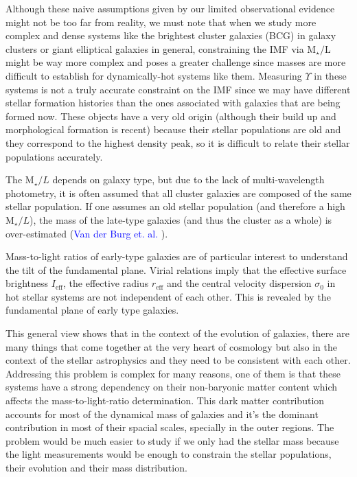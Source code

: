 Although these naive assumptions given by our limited observational evidence might not be too far from reality, we must note that when we study more complex and dense systems like the brightest cluster galaxies (BCG) in galaxy clusters or giant elliptical galaxies in general, constraining the IMF via $\textrm{M}_{\star}/\textrm{L}$ might be way more complex and poses a greater challenge since masses are more difficult to establish for dynamically-hot systems like them. Measuring $\Upsilon$ in these systems is not a truly accurate constraint on the IMF since we may have different stellar formation histories than the ones associated with galaxies that are being formed now. These objects have a very old origin (although their build up and morphological formation is recent) because their stellar populations are old and they correspond to the highest density peak, so it is difficult to relate their stellar populations accurately.

The $\text{M}_{\star}/L$ depends on galaxy type, but due to the lack of multi-wavelength photometry, it is often assumed that all cluster galaxies are composed of the same stellar population. If one assumes an old stellar population (and therefore a high $\text{M}_{\star}/L$), the mass of the late-type galaxies (and thus the cluster as a whole) is over-estimated (\textcolor{blue}{Van der Burg et. al.} \citeyear{Reference2}).

Mass-to-light ratios of early-type galaxies are of particular interest to understand the tilt of the fundamental plane. Virial relations imply that the effective surface brightness $I_{\text{eff}}$, the effective radius $r_{\text{eff}}$ and the central velocity dispersion $\sigma_{0}$ in hot stellar systems are not independent of each other. This is revealed by the fundamental plane of early type galaxies.

This general view shows that in the context of the evolution of galaxies, there are many things that come together at the very heart of cosmology but also in the context of the stellar astrophysics and they need to be consistent with each other. Addressing this problem is complex for many reasons, one of them is that these systems have a strong dependency on their non-baryonic matter content which affects the mass-to-light-ratio determination. This dark matter contribution accounts for most of the dynamical mass of galaxies and it's the dominant contribution in most of their spacial scales, specially in the outer regions. The problem would be much easier to study if we only had the stellar mass because the light measurements would be enough to constrain the stellar populations, their evolution and their mass distribution. 

